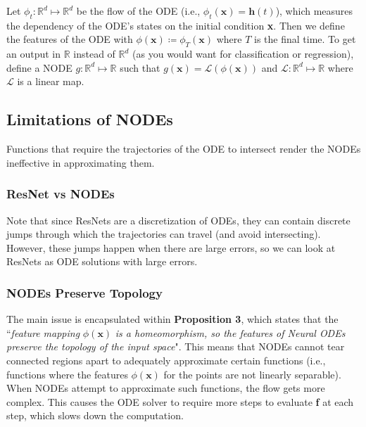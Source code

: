 \documentclass[letterpaper,12 pt]{article}
\begin{document}
\vspace{4mm}Let $\phi_t:\mathbb{R}^d\mapsto \mathbb{R}^d$ be the flow of the ODE (i.e., $\phi_t(\textbf{x})=\textbf{h}(t)$), which measures the dependency of the ODE's states on the initial condition \textbf{x}. Then we define the features of the ODE with $\phi(\textbf{x}) \coloneqq \phi_T(\textbf{x})$ where $T$ is the final time. To get an output in $\mathbb{R}$ instead of $\mathbb{R}^d$ (as you would want for classification or regression), define a NODE $g:\mathbb{R}^d\mapsto \mathbb{R}$ such that $g(\boldsymbol{x})=\mathcal{L}(\phi(\boldsymbol{x}))$ and $\mathcal{L}:\mathbb{R}^d \mapsto \mathbb{R}$ where $\mathcal{L}$ is a linear map.

\subsection{Limitations of NODEs} Functions that require the trajectories of the ODE to intersect render the NODEs ineffective in approximating them. 

\subsubsection{ResNet vs NODEs}
Note that since ResNets are a discretization of ODEs, they can contain discrete jumps through which the trajectories can travel (and avoid intersecting). However, these jumps happen when there are large errors, so we can look at ResNets as ODE solutions with large errors. 

\subsubsection{NODEs Preserve Topology}
The main issue is encapsulated within \textbf{Proposition 3}, which states that the ``\textit{feature mapping} $\phi(\textbf{x})$ \textit{is a homeomorphism, so the features of Neural ODEs preserve the topology of the input space}". This means that NODEs cannot tear connected regions apart to adequately approximate certain functions (i.e., functions where the features $\phi(\textbf{x})$ for the points are not linearly separable). When NODEs attempt to approximate such functions, the flow gets more complex. This causes the ODE solver to require more steps to evaluate \textbf{f} at each step, which slows down the computation.
\end{document}
